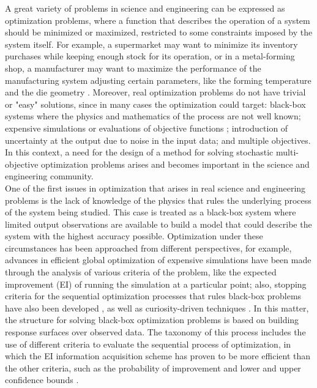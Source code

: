 \documentclass{article}
\begin{document}
A great variety of problems in science and engineering can be expressed as optimization problems, where a function that describes the operation of a system should be minimized or maximized, restricted to some constraints imposed by the system itself. For example, a supermarket may want to minimize its inventory purchases while keeping enough stock for its operation, or in a metal-forming shop, a manufacturer may want to maximize the performance of the manufacturing system adjusting certain parameters, like the forming temperature and the die geometry \cite{Huang2006}. Moreover, real optimization problems do not have trivial or "easy" solutions, since in many cases the optimization could target: black-box systems where the physics and mathematics of the process are not well known; expensive simulations or evaluations of objective functions \cite{Jones1998}; introduction of uncertainty at the output due to noise in the input data; and multiple objectives. In this context, a need for the design of a method for solving stochastic multi-objective optimization problems arises and becomes important in the science and engineering community.\\

One of the first issues in optimization that arises in real science and engineering problems is the lack of knowledge of the physics that rules the underlying process of the system being studied. This case is treated as a black-box system where limited output observations are available to build a model that could describe the system with the highest accuracy possible. Optimization under these circumstances has been approached from different perspectives, for example, advances in efficient global optimization of expensive simulations have been made through the analysis of various criteria of the problem, like the expected improvement (EI) of running the simulation at a particular point; also, stopping criteria for the sequential optimization processes that rules black-box problems have also been developed \cite{Jones1998}, as well as curiosity-driven techniques \cite{Schaul2011}. In this matter, the structure for solving black-box optimization problems is based on building response surfaces over observed data. The taxonomy of this process includes the use of different criteria to evaluate the sequential process of optimization, in which the EI information acquisition scheme has proven to be more efficient than the other criteria, such as the probability of improvement and lower and upper confidence bounds \cite{Jones2001}.\\
\end{document}
